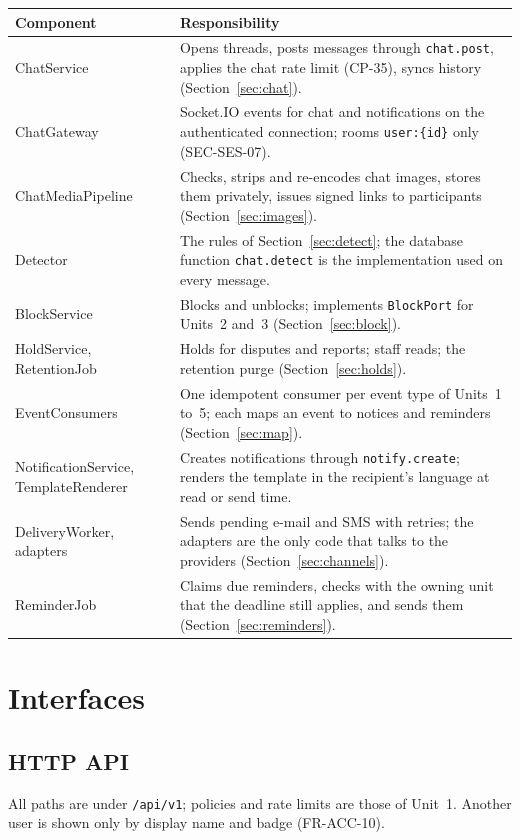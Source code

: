 \documentclass[11pt,a4paper]{article}
\newenvironment{dtable}[1]{\small\begin{longtable}{#1}}{\end{longtable}}
\begin{document}
\begin{dtable}{@{}>{\raggedright\arraybackslash}p{3.8cm}>{\raggedright\arraybackslash}p{11.4cm}@{}}
\toprule
\textbf{Component} & \textbf{Responsibility} \\ \midrule \endhead
ChatService & Opens threads, posts messages through \texttt{chat.post}, applies the chat rate limit (CP-35), syncs history (Section~\ref{sec:chat}). \\
ChatGateway & Socket.IO events for chat and notifications on the authenticated connection; rooms \texttt{user:\{id\}} only (SEC-SES-07). \\
ChatMediaPipeline & Checks, strips and re-encodes chat images, stores them privately, issues signed links to participants (Section~\ref{sec:images}). \\
Detector & The rules of Section~\ref{sec:detect}; the database function \texttt{chat.detect} is the implementation used on every message. \\
BlockService & Blocks and unblocks; implements \texttt{BlockPort} for Units~2 and~3 (Section~\ref{sec:block}). \\
HoldService, RetentionJob & Holds for disputes and reports; staff reads; the retention purge (Section~\ref{sec:holds}). \\
EventConsumers & One idempotent consumer per event type of Units~1 to~5; each maps an event to notices and reminders (Section~\ref{sec:map}). \\
NotificationService, TemplateRenderer & Creates notifications through \texttt{notify.create}; renders the template in the recipient's language at read or send time. \\
DeliveryWorker, adapters & Sends pending e-mail and SMS with retries; the adapters are the only code that talks to the providers (Section~\ref{sec:channels}). \\
ReminderJob & Claims due reminders, checks with the owning unit that the deadline still applies, and sends them (Section~\ref{sec:reminders}). \\
\bottomrule
\end{dtable}
\section{Interfaces}

\subsection{HTTP API}
\label{sec:api}
All paths are under \texttt{/api/v1}; policies and rate limits are those of Unit~1. Another user is shown only by display name and badge (FR-ACC-10).
\end{document}
